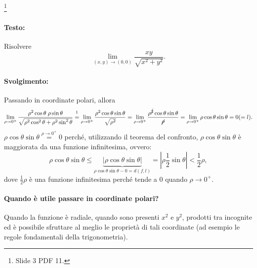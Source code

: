 \begin{example}\footnote{Slide 3 PDF 11.}
    \paragraph{Testo:} Risolvere
    \begin{equation*}
        \lim\limits_{(x,y)\rightarrow(0,0)}\frac{xy}{\sqrt{x^2+y^2}}.
    \end{equation*}
    \paragraph{Svolgimento:}Passando in coordinate polari, allora
    \begin{equation*}
        \lim\limits_{\rho\rightarrow 0^+}\frac{\rho^2\cos\theta\;\rho\sin\theta}{\sqrt{\rho^2\cos^2\theta+\rho^2\sin^2\theta}}\overset{\footnotemark}{=}\lim\limits_{\rho\rightarrow 0^+}\frac{\rho^2\cos\theta\sin\theta}{\sqrt{\rho^2}}=\lim\limits_{\rho\rightarrow 0^+}\frac{\rho^{\cancel{2}}\cos\theta\sin\theta}{\cancel{\rho}}=\lim\limits_{\rho\rightarrow 0^+}\rho\cos\theta\sin\theta=0(=l).
    \end{equation*}
    $\rho\cos\theta\sin\theta\overset{\rho\rightarrow0^+}{=}0$ perché, utilizzando il teorema del confronto, $\rho\cos\theta\sin\theta$ è maggiorata da una \gls{funzione infinitesima}, ovvero:
    \begin{equation*}
        \rho\cos\theta\sin\theta\leq\underbrace{|\rho\cos\theta\sin\theta|}_{\rho\cos\theta\sin\theta-0=d(f,l)}=\left|\rho\frac{1}{2}\sin\theta\right|<\frac{1}{2}\rho,
    \end{equation*}
    dove $\frac{1}{2}\rho$ è una funzione infinitesima perché tende a 0 quando $\rho\rightarrow 0^+$.
\end{example}

\paragraph{Quando è utile passare in coordinate polari?} Quando la funzione è radiale, quando sono presenti $x^2$ e $y^2$, prodotti tra incognite ed è possibile sfruttare al meglio le proprietà di tali coordinate (ad esempio le regole fondamentali della trigonometria).

